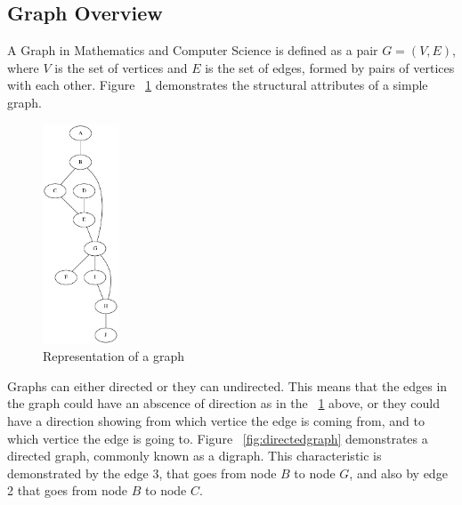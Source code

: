 \label{Graph Basics}



\subsection{Graph Overview}
A Graph in Mathematics and Computer Science is defined as a pair $G = (V, E)$,  where $V$ is the set of vertices and $E$ is the set of edges, formed by pairs of vertices with each other. Figure ~\ref{fig:simplegraph} demonstrates the structural 
attributes of a simple graph.

\begin{figure}[H]
  \begin{center}
      \includegraphics[width=0.2\textwidth]{simplegraph.png}
  \end{center}    
  \caption{Representation of a graph}
  \label{fig:simplegraph}
\end{figure} 
Graphs can either directed or they can undirected. This means that the edges in the graph could have an abscence of direction as in the ~\ref{fig:simplegraph} above, or they could have a direction showing from which
vertice the edge is coming from, and to which vertice the edge is going to. Figure ~\ref{fig:directedgraph} demonstrates a directed graph, commonly known as a digraph. This characteristic is demonstrated by the edge $3$, 
that goes from node $B$ to node $G$, and also by edge 2 that goes from node $B$ to node $C$. 

